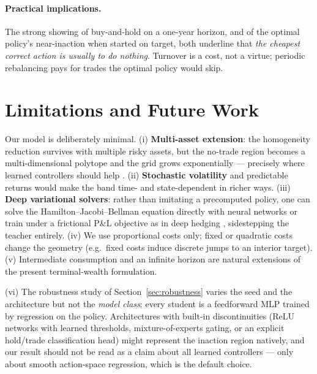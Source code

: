 \documentclass[11pt]{article}
\begin{document}
\paragraph{Practical implications.}
The strong showing of buy-and-hold on a one-year horizon, and of the optimal
policy's near-inaction when started on target, both underline that \emph{the
cheapest correct action is usually to do nothing}. Turnover is a cost, not a
virtue; periodic rebalancing pays for trades the optimal policy would skip.

\section{Limitations and Future Work}

Our model is deliberately minimal. (i) \textbf{Multi-asset extension}: the
homogeneity reduction survives with multiple risky assets, but the no-trade
region becomes a multi-dimensional polytope and the grid grows exponentially ---
precisely where learned controllers should help \citep{liu2004}. (ii)
\textbf{Stochastic volatility} and predictable returns
\citep{garleanupedersen2013} would make the band time- and state-dependent in
richer ways. (iii) \textbf{Deep variational solvers}: rather than imitating a
precomputed policy, one can solve the Hamilton--Jacobi--Bellman equation directly
with neural networks \citep{hanjentzene2018} or train under a frictional P\&L
objective as in deep hedging \citep{buehler2019deephedging}, sidestepping the
teacher entirely. (iv) We use proportional costs only; fixed or quadratic costs
change the geometry (e.g.\ fixed costs induce discrete jumps to an interior
target). (v) Intermediate consumption and an infinite horizon are natural
extensions of the present terminal-wealth formulation.

(vi) The robustness study of Section~\ref{sec:robustness} varies the seed and
the architecture but not the \emph{model class}: every student is a feedforward
MLP trained by regression on the policy. Architectures with built-in
discontinuities (ReLU networks with learned thresholds, mixture-of-experts
gating, or an explicit hold/trade classification head) might represent the
inaction region natively, and our result should not be read as a claim about all
learned controllers --- only about smooth action-space regression, which is the
default choice.
\end{document}
